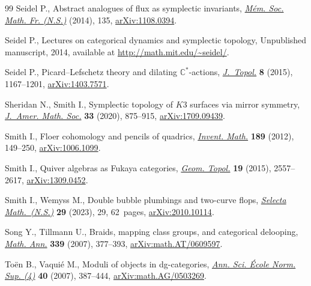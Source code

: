 \documentclass[pdftex]{sigma}
\theoremstyle{definition}
\numberwithin{equation}{section}
\begin{document}
\begin{thebibliography}{99}
Seidel P., Abstract analogues of flux as symplectic invariants,
 \href{https://doi.org/10.24033/msmf.447}{\textit{M\'em. Soc. Math. Fr.
 (N.S.)}} (2014), 135,
 \href{http://arxiv.org/abs/1108.0394}{arXiv:1108.0394}.

Seidel P., Lectures on categorical dynamics and symplectic topology,
 {U}npublished manuscript, 2014, available at
 \url{http://math.mit.edu/~seidel/}.

Seidel P., Picard--{L}efschetz theory and dilating {$\mathbb{C}^*$}-actions,
 \href{https://doi.org/10.1112/jtopol/jtv029}{\textit{J.~Topol.}} \textbf{8}
 (2015), 1167--1201, \href{http://arxiv.org/abs/1403.7571}{arXiv:1403.7571}.

Sheridan N., Smith I., Symplectic topology of {$K3$} surfaces via mirror
 symmetry, \href{https://doi.org/10.1090/jams/946}{\textit{J.~Amer. Math.
 Soc.}} \textbf{33} (2020), 875--915,
 \href{http://arxiv.org/abs/1709.09439}{arXiv:1709.09439}.

Smith I., Floer cohomology and pencils of quadrics,
 \href{https://doi.org/10.1007/s00222-011-0364-1}{\textit{Invent. Math.}}
 \textbf{189} (2012), 149--250,
 \href{http://arxiv.org/abs/1006.1099}{arXiv:1006.1099}.

Smith I., Quiver algebras as {F}ukaya categories,
 \href{https://doi.org/10.2140/gt.2015.19.2557}{\textit{Geom. Topol.}}
 \textbf{19} (2015), 2557--2617,
 \href{http://arxiv.org/abs/1309.0452}{arXiv:1309.0452}.

Smith I., Wemyss M., Double bubble plumbings and two-curve flops,
 \href{https://doi.org/10.1007/s00029-023-00828-z}{\textit{Selecta
 Math.~(N.S.)}} \textbf{29} (2023), 29, 62~pages,
 \href{http://arxiv.org/abs/2010.10114}{arXiv:2010.10114}.

Song Y., Tillmann U., Braids, mapping class groups, and categorical delooping,
 \href{https://doi.org/10.1007/s00208-007-0117-z}{\textit{Math. Ann.}}
 \textbf{339} (2007), 377--393, \href{http://arxiv.org/abs/math.AT/0609597}{arXiv:math.AT/0609597}.

To\"{e}n B., Vaqui\'e M., Moduli of objects in dg-categories,
 \href{https://doi.org/10.1016/j.ansens.2007.05.001}{\textit{Ann. Sci.
 \'{E}cole Norm. Sup. (4)}} \textbf{40} (2007), 387--444, \href{http://arxiv.org/abs/math.AG/0503269}{arXiv:math.AG/0503269}.


\end{thebibliography}
\end{document}
